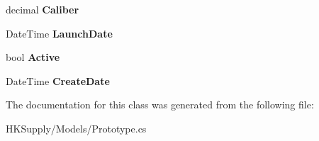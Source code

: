 \begin{DoxyCompactItemize}
decimal {\bfseries Caliber}
\item 
\mbox{\label{class_h_k_supply_1_1_models_1_1_prototype_ac9b2874af48c4e253f3ac8d61a5d8858}} 
Date\+Time {\bfseries Launch\+Date}
\item 
\mbox{\label{class_h_k_supply_1_1_models_1_1_prototype_a2b7eb7aac1ef312d0282085dc6039d5b}} 
bool {\bfseries Active}
\item 
\mbox{\label{class_h_k_supply_1_1_models_1_1_prototype_a8ca999b1ba2ff4975ccfd3bfc5faf470}} 
Date\+Time {\bfseries Create\+Date}
\end{DoxyCompactItemize}


The documentation for this class was generated from the following file\+:\begin{DoxyCompactItemize}
\item 
H\+K\+Supply/\+Models/Prototype.\+cs\end{DoxyCompactItemize}
